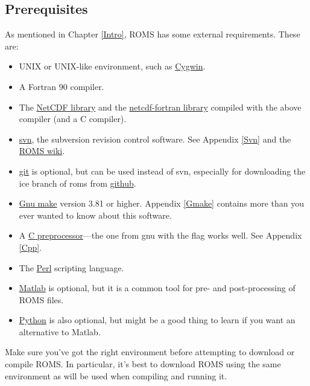 \subsection{Prerequisites}
As mentioned in Chapter \ref{Intro}, ROMS has some external
requirements. These are:
\begin{itemize}
    \item UNIX or UNIX-like environment, such as
      \href{http://www.redhat.com/services/custom/cygwin/}{Cygwin}.
    \item A Fortran 90 compiler.
    \item The
      \href{http://www.unidata.ucar.edu/software/netcdf/index.html}{NetCDF
      library} and the
      \href{https://www.unidata.ucar.edu/downloads/netcdf/netcdf-fortran/index.jsp}{netcdf-fortran
      library} compiled with the above compiler (and a C compiler).
    \item \href{http://subversion.tigris.org}{svn}, the subversion
      revision control software. See Appendix \ref{Svn} and the
      \href{https://www.myroms.org/wiki/index.php/Subversion}{ROMS wiki}.
    \item \href{https://git-scm.com/}{git} is optional, but can be
      used instead of svn, especially for downloading the ice branch
      of roms from \href{https://github.com/kshedstrom/roms}{github}.
    \item \href{http://www.gnu.org/software/make/}{Gnu make} version
      3.81 or higher. Appendix \ref{Gmake} contains more than you
      ever wanted to know about this software.
    \item A \href{http://en.wikipedia.org/wiki/C_preprocessor}{C
      preprocessor}---the one from gnu with the 
      flag works well. See Appendix \ref{Cpp}.
    \item The \href{http://www.perl.org}{Perl} scripting language.
    \item \href{http://www.mathworks.com/products/matlab/}{Matlab} is
      optional, but it is a common tool for pre- and post-processing
      of ROMS files.
    \item \href{https://www.python.org/}{Python} is also
      optional, but might be a good thing to learn if you want an
      alternative to Matlab.
\end{itemize}
Make sure you've got the right environment before attempting to
download or compile ROMS. In particular, it's best to download ROMS
using the same environment as will be used when compiling and
running it.

